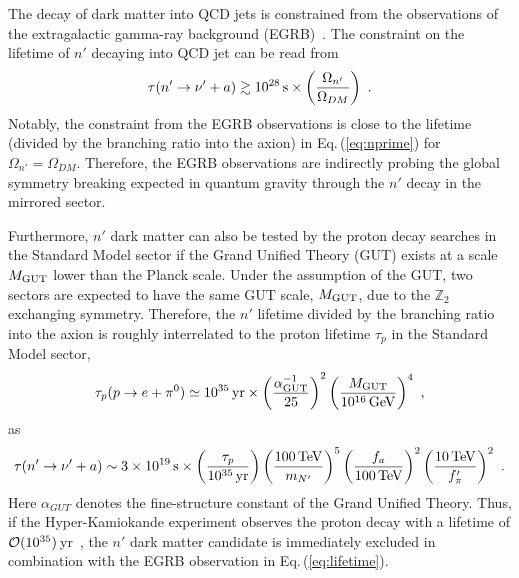 \documentclass[aps,amsmath,preprint,epsf,superscriptaddress,nofootinbib,notitlepage]{revtex4-1}
\begin{document}
The decay of dark matter into QCD jets is constrained from the observations of the extragalactic 
gamma-ray background (EGRB)~\cite{Ibarra:2007wg,Ishiwata:2009dk,Carquin:2015uma,Ando:2015qda,*Ando:2016ang}.
The constraint on the lifetime of $n'$ decaying into QCD jet can be read from \cite{Ando:2015qda,*Ando:2016ang}
\begin{eqnarray}
\label{eq:lifetime}
\tau(n' \to \nu' + a) \gtrsim 10^{28}\,{\rm s}\times \left(\frac{\Omega_{n'}}{\Omega_{DM}} \right)
\ .
\end{eqnarray}
Notably, the constraint from the EGRB observations is close to the lifetime (divided by the branching ratio into the axion) in Eq.\,(\ref{eq:nprime})
for $\Omega_{n'} = \Omega_{DM}$.
Therefore, the EGRB observations are indirectly probing the global symmetry breaking expected in quantum gravity 
through the $n'$ decay in the mirrored sector.

Furthermore,  $n'$ dark matter can also be tested by the proton decay searches in the Standard Model sector
if the Grand Unified Theory (GUT) exists at a scale $M_{\rm GUT}$ lower than the Planck scale.
Under the assumption of the GUT, two sectors are expected to have the same GUT scale, $M_{\rm GUT}$, 
due to the $\mathbb Z_2$ exchanging symmetry.
Therefore, the $n'$ lifetime divided by the branching ratio into the axion is roughly interrelated to the proton lifetime $\tau_p$ 
in the Standard Model sector,
\begin{eqnarray}
\tau_p(p\to e+\pi^0) \simeq 10^{35}\, {\rm yr}\times \left(\frac{\alpha_{\rm GUT}^{-1}}{25}\right)^2
\left(\frac{M_{\rm GUT}}{10^{16}\,\rm GeV}\right)^4\ ,
\end{eqnarray}
as
\begin{eqnarray}
\label{eq:lifetime2}
\tau(n' \to \nu' + a) \sim 3 \times10^{19}\,{\rm s}\times 
\left(\frac{\tau_p}{10^{35}\,\rm yr}\right)
\left(\frac{100\,{\rm TeV}}{m_{N'}}\right)^5
\left(\frac{f_a}{100\,\rm TeV}\right)^2
\left(\frac{10\,\rm TeV}{f_\pi'}\right)^2\ .
\end{eqnarray}
Here $\alpha_{GUT}$ denotes the fine-structure constant of the Grand Unified Theory.
Thus, if the Hyper-Kamiokande experiment observes the proton decay with a lifetime of ${\cal O}(10^{35})$\,yr~\cite{Hyper-Kamiokande:2016dsw}, 
the $n'$ dark matter candidate is immediately excluded in combination with the EGRB observation in Eq.\,(\ref{eq:lifetime}).

\end{document}
